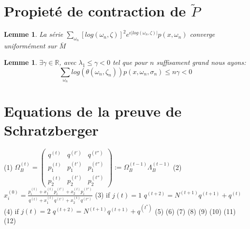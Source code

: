 \documentclass[12pt]{article}
\theoremstyle{plain}%
\newtheorem{lem}[thm]{Lemme}
\theoremstyle{definition}
\theoremstyle{remark}
\begin{document}
\section{Propieté de contraction de $\tilde{P}$}

\begin{lem}
La série $\sum_{\omega_n} [log(\omega_n,\zeta)]^2 e^{\epsilon |log(\omega_n,\zeta)|}p(x,\omega_n)$ converge uniformément sur $\bar{M}$
\end{lem}

\begin{lem}
$\exists \gamma \in \mathbb{R}$, avec $\lambda_1 \leq \gamma < 0$ tel que pour $n$ suffisament grand nous ayons:$$
\sum_{\omega_n} log(\theta(\omega_n,\zeta_n))p(x,\omega_n,\sigma_n) \leq n \gamma <0
$$
\end{lem}

\section{Equations de la preuve de Schratzberger}
(1)
$\Omega_B^{(t)}=\begin{pmatrix}
q^{(t)} & q^{(t')} & q^{(t'')} \\
p_1^{(t)} & p_1^{(t')} & p_1^{(t'')}\\
p_2^{(t)} & p_2^{(t')} & p_2^{(t'')}
\end{pmatrix}
:= \Omega_B^{(t-1)} \Lambda_B^{(t-1)}$
\newline
(2)
$x_i^(0)=\frac{p_i^{(t)}+x_1^{(t)}p_i^{(t')}+x_2^{(t)}p_i^{(t'')}}{q^{(t)}+x_1^{(t)}q^{(t')}+x_2^{(t)}q^{(t'')}}$
\newline
(3)
if $j(t)=1$ $q^{(t+2)}=N^{(t+1)}q^{(t+1)}+q^{(t)}$
\newline
(4)
if $j(t)=2$ $q^{(t+2)}=N^{(t+1)}q^{(t+1)}+q^{(t^*)}$
\newline
(5)
(6)
(7)
(8)
(9)
(10)
(11)
(12)
\end{document}
